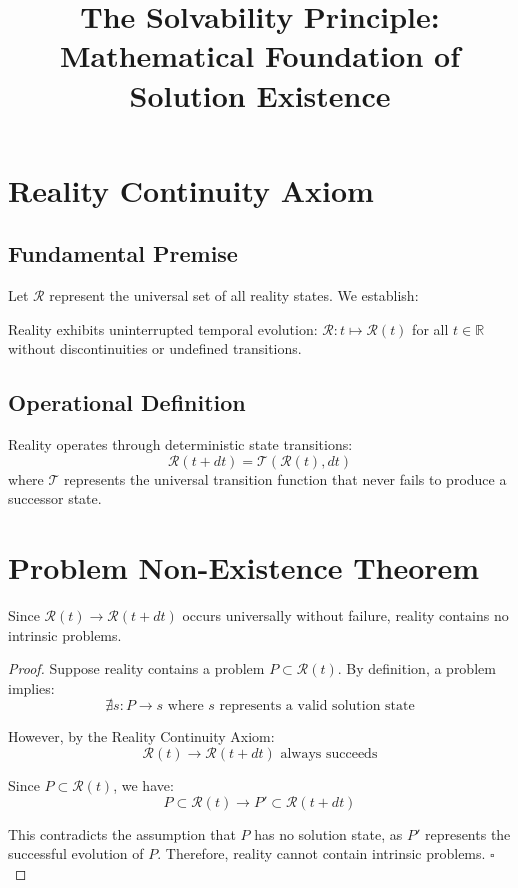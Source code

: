 \documentclass{article}
\title{The Solvability Principle: Mathematical Foundation of Solution Existence}
\author{}
\date{}
\begin{document}
\maketitle

\section{Reality Continuity Axiom}

\subsection{Fundamental Premise}
Let $\mathcal{R}$ represent the universal set of all reality states. We establish:

\begin{axiom}
Reality exhibits uninterrupted temporal evolution: $\mathcal{R}: t \mapsto \mathcal{R}(t)$ for all $t \in \mathbb{R}$ without discontinuities or undefined transitions.
\end{axiom}

\subsection{Operational Definition}
Reality operates through deterministic state transitions:
$$\mathcal{R}(t+dt) = \mathcal{T}(\mathcal{R}(t), dt)$$
where $\mathcal{T}$ represents the universal transition function that never fails to produce a successor state.

\section{Problem Non-Existence Theorem}

\begin{theorem}
Since $\mathcal{R}(t) \rightarrow \mathcal{R}(t+dt)$ occurs universally without failure, reality contains no intrinsic problems.
\end{theorem}

\begin{proof}
Suppose reality contains a problem $P \subset \mathcal{R}(t)$. By definition, a problem implies:
$$\nexists s: P \rightarrow s \text{ where } s \text{ represents a valid solution state}$$

However, by the Reality Continuity Axiom:
$$\mathcal{R}(t) \rightarrow \mathcal{R}(t+dt) \text{ always succeeds}$$

Since $P \subset \mathcal{R}(t)$, we have:
$$P \subset \mathcal{R}(t) \rightarrow P' \subset \mathcal{R}(t+dt)$$

This contradicts the assumption that $P$ has no solution state, as $P'$ represents the successful evolution of $P$. Therefore, reality cannot contain intrinsic problems. $\square$
\end{proof}
\end{document}
